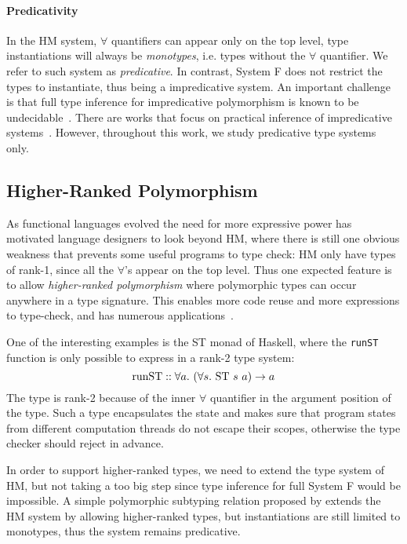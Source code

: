 \paragraph{Predicativity}
In the HM system, $\forall$ quantifiers can appear only on the top level,
type instantiations will always be \emph{monotypes},
i.e. types without the $\forall$ quantifier.
We refer to such system as \emph{predicative}.
In contrast, System F does not restrict the types to instantiate,
thus being a impredicative system.
An important challenge is that full type inference for impredicative
polymorphism is known to be undecidable~\citep{wells1999typability}.
There are works that focus on practical inference of
impredicative systems~\citep{le2003ml,leijen2008hmf,
vytiniotis2008fph,Serrano2018,quicklook2020,FreezeML}.
However, throughout this work, we study predicative type systems only.

\subsection{Higher-Ranked Polymorphism}
As functional languages evolved the need for more expressive
power has motivated language designers to look beyond HM,
where there is still one obvious weakness that prevents some useful programs to type check:
HM only have types of rank-1, since all the $\forall$'s appear on the top level.
Thus one expected feature is to allow 
\emph{higher-ranked polymorphism} where polymorphic types can
occur anywhere in a type signature.
This enables more code reuse and more expressions to type-check, and has
numerous applications~\citep{jones1995functional,gill1993short,launchbury1995state,lammel2003scrap}.

One of the interesting examples is the ST monad of Haskell,
where the \verb|runST| function is only possible to express in a rank-2 type system:
$$\text{runST} :: \all[a]{(\all[s]{\text{ST}~s~a}) \to a}$$
The type is rank-2 because of the inner $\forall$ quantifier
in the argument position of the type.
Such a type encapsulates the state and makes sure
that program states from different computation threads do not escape their scopes,
otherwise the type checker should reject in advance.

In order to support higher-ranked types, we need to extend the type system of HM,
but not taking a too big step since type inference for full System F would be impossible.
A simple polymorphic subtyping relation
proposed by \citet{odersky1996putting}
extends the HM system by allowing higher-ranked types,
but instantiations are still limited to monotypes,
thus the system remains predicative.

